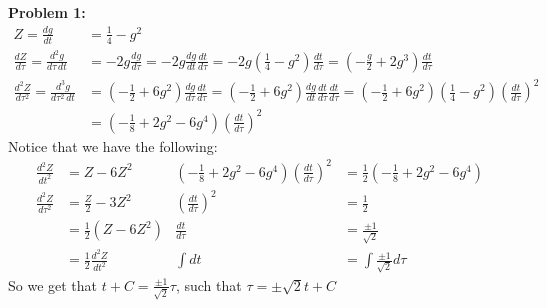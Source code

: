 \documentclass[11pt]{article}
\newenvironment{problem}[1]{\textbf{Problem #1: }}{\newpage}
\begin{document}
\begin{problem}{1}
		\begin{align*}
			Z = \frac{dg}{dt} &= \frac{1}{4} - g^2 \\
			\frac{dZ}{d\tau} = \frac{d^2g}{d\tau\,dt} &= -2g\frac{dg}{d\tau} = -2g\frac{dg}{dt}\frac{dt}{d\tau} = -2g\left(\frac{1}{4} - g^2 \right)\frac{dt}{d\tau} = \left(-\frac{g}{2} + 2g^3\right)\frac{dt}{d\tau} \\
			\frac{d^2Z}{d\tau^2} = \frac{d^3 g}{d\tau^2\,dt} &= \left(-\frac{1}{2} + 6g^2\right)\frac{dg}{d\tau}\frac{dt}{d\tau} = \left(-\frac{1}{2} + 6g^2\right)\frac{dg}{dt}\frac{dt}{d\tau}\frac{dt}{d\tau} = \left(-\frac{1}{2} + 6g^2\right)\left(\frac{1}{4} - g^2 \right)\left(\frac{dt}{d\tau}\right)^2 \\
			&= \left(-\frac{1}{8} + 2g^2 - 6g^4\right)\left(\frac{dt}{d\tau}\right)^2
		\end{align*}
		Notice that we have the following:
		\begin{align*}
			\frac{d^2 Z}{dt^2} &= Z - 6Z^2 & \left(-\frac{1}{8} + 2g^2 - 6g^4\right)\left(\frac{dt}{d\tau}\right)^2 &= \frac{1}{2}\left(-\frac{1}{8} + 2g^2 - 6g^4\right)\\
			\frac{d^2 Z}{d\tau^2} &= \frac{Z}{2} - 3Z^2 & \left(\frac{dt}{d\tau}\right)^2 &= \frac{1}{2}\\
			&= \frac{1}{2}\left(Z - 6Z^2\right) & \frac{dt}{d\tau} &= \frac{\pm 1}{\sqrt{2}}\\
			&= \frac{1}{2}\frac{d^2 Z}{dt^2} & \int dt &= \int \frac{\pm 1}{\sqrt{2}}d\tau
		\end{align*}
		So we get that $t + C = \frac{\pm 1}{\sqrt{2}}\tau$, such that $\tau = \pm \sqrt{2}t + C$
	\end{problem}
	
\end{document}
